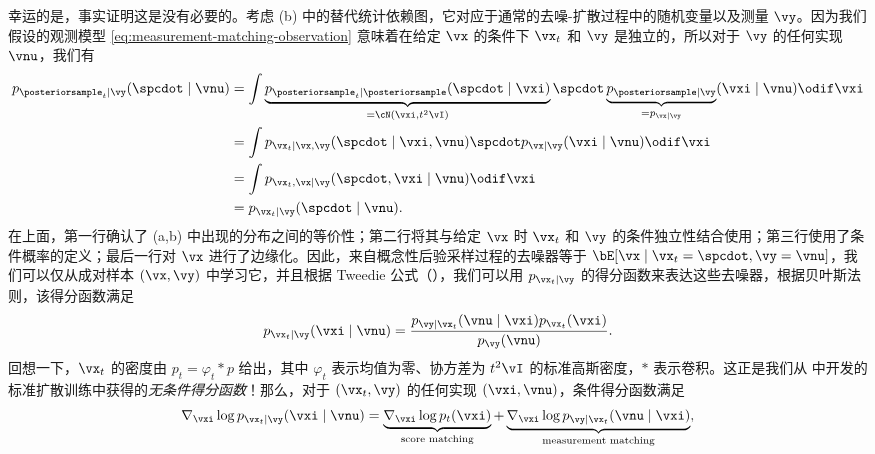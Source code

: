 \documentclass[../../book-main_zh.tex]{subfiles}
\begin{document}
幸运的是，事实证明这是没有必要的。考虑 (b) 中的替代统计依赖图，它对应于通常的去噪-扩散过程中的随机变量以及测量 $\vy$。因为我们假设的观测模型 \eqref{eq:measurement-matching-observation} 意味着在给定 $\vx$ 的条件下 $\vx_t$ 和 $\vy$ 是独立的，所以对于 $\vy$ 的任何实现 $\vnu$，我们有
\begin{equation}\label{eq:conditional-denoising-conditioning-order-irrelevant}
    \begin{split}
        p_{\posteriorsample_t\mid \vy}(\spcdot \mid \vnu)
        &= \int
        \underbrace{p_{\posteriorsample_t \mid
        \posteriorsample}(\spcdot\mid \vxi)}_{=
        \cN(\vxi, t^2 \vI)}
        \spcdot \underbrace{p_{\posteriorsample \mid \vy}}_{=
        p_{\vx\mid \vy}}(\vxi \mid
        \vnu)
        \odif \vxi
        \\
        &=
        \int p_{\vx_t \mid \vx, \vy}(\spcdot\mid \vxi, \vnu) \spcdot p_{\vx \mid
        \vy}(\vxi\mid \vnu) \odif \vxi
        \\
        &=
        \int p_{\vx_t, \vx \mid \vy}(\spcdot, \vxi \mid \vnu) \odif \vxi
        \\
        &= p_{\vx_t \mid \vy}(\spcdot\mid \vnu).
    \end{split}
\end{equation}
在上面，第一行确认了  (a,b) 中出现的分布之间的等价性；第二行将其与给定 $\vx$ 时 $\vx_t$ 和 $\vy$ 的条件独立性结合使用；第三行使用了条件概率的定义；最后一行对 $\vx$ 进行了边缘化。因此，来自概念性后验采样过程的去噪器等于 $\bE[\vx \mid \vx_t=\spcdot, \vy=\vnu]$，我们可以仅从成对样本 $(\vx,
\vy)$ 中学习它，并且根据 Tweedie 公式（），我们可以用 $p_{\vx_t \mid \vy}$ 的得分函数来表达这些去噪器，根据贝叶斯法则，该得分函数满足
\begin{equation}
    p_{\vx_t \mid \vy}(\vxi \mid \vnu)
    = \frac{p_{\vy \mid \vx_t}(\vnu \mid \vxi) p_{\vx_t}(\vxi)}{p_{\vy}(\vnu)}.
\end{equation}
回想一下，$\vx_t$ 的密度由 $p_t = \varphi_{t} \ast p$ 给出，其中 $\varphi_{t}$ 表示均值为零、协方差为 $t^2 \vI$ 的标准高斯密度，$\ast$ 表示卷积。这正是我们从  中开发的标准扩散训练中获得的\textit{无条件得分函数}！那么，对于 $(\vx_t, \vy)$ 的任何实现 $(\vxi,
\vnu)$，条件得分函数满足
\begin{equation}
    \nabla_{\vxi} \log p_{\vx_t \mid \vy}(\vxi\mid \vnu)
    =
    \underbrace{\nabla_{\vxi} \log p_t(\vxi)}_{\text{score matching}}
    +
    \underbrace{\nabla_{\vxi} \log p_{\vy \mid \vx_t}(\vnu \mid
    \vxi)}_{\text{measurement matching}},
    \label{eqn:conditional-denoising-score}
\end{equation}
\end{document}
